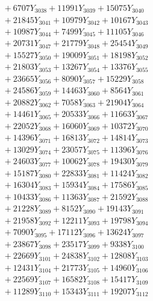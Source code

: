 \documentclass[a4paper,10pt]{article}
\begin{document}
{\begin{align}
&\;  + 6707 Y_{3038} + 11991 Y_{3039} + 15075 Y_{3040} \\[0.3ex]
&\;  + 21845 Y_{3041} + 10979 Y_{3042} + 10167 Y_{3043} \\[0.3ex]
&\;  + 10987 Y_{3044} + 7499 Y_{3045} + 11105 Y_{3046} \\[0.3ex]
&\;  + 20731 Y_{3047} + 21779 Y_{3048} + 25454 Y_{3049} \\[0.3ex]
&\;  + 15527 Y_{3050} + 19009 Y_{3051} + 18198 Y_{3052} \\[0.3ex]
&\;  + 21803 Y_{3053} + 13267 Y_{3054} + 13376 Y_{3055} \\[0.3ex]
&\;  + 23665 Y_{3056} + 8090 Y_{3057} + 15229 Y_{3058} \\[0.5ex]\allowbreak
&\;  + 24586 Y_{3059} + 14463 Y_{3060} + 8564 Y_{3061} \\[0.3ex]
&\;  + 20882 Y_{3062} + 7058 Y_{3063} + 21904 Y_{3064} \\[0.3ex]
&\;  + 14461 Y_{3065} + 20533 Y_{3066} + 11663 Y_{3067} \\[0.3ex]
&\;  + 22052 Y_{3068} + 16060 Y_{3069} + 10372 Y_{3070} \\[0.3ex]
&\;  + 14396 Y_{3071} + 16813 Y_{3072} + 14814 Y_{3073} \\[0.3ex]
&\;  + 13029 Y_{3074} + 23057 Y_{3075} + 11396 Y_{3076} \\[0.3ex]
&\;  + 24603 Y_{3077} + 10062 Y_{3078} + 19430 Y_{3079} \\[0.3ex]
&\;  + 15187 Y_{3080} + 22833 Y_{3081} + 11424 Y_{3082} \\[0.3ex]
&\;  + 16304 Y_{3083} + 15934 Y_{3084} + 17586 Y_{3085} \\[0.3ex]
&\;  + 10433 Y_{3086} + 11363 Y_{3087} + 21592 Y_{3088} \\[0.5ex]\allowbreak
&\;  + 21228 Y_{3089} + 8152 Y_{3090} + 19143 Y_{3091} \\[0.3ex]
&\;  + 21958 Y_{3092} + 12211 Y_{3093} + 19798 Y_{3094} \\[0.3ex]
&\;  + 7090 Y_{3095} + 17112 Y_{3096} + 13624 Y_{3097} \\[0.3ex]
&\;  + 23867 Y_{3098} + 23517 Y_{3099} + 9338 Y_{3100} \\[0.3ex]
&\;  + 22669 Y_{3101} + 24838 Y_{3102} + 12808 Y_{3103} \\[0.3ex]
&\;  + 12431 Y_{3104} + 21773 Y_{3105} + 14960 Y_{3106} \\[0.3ex]
&\;  + 22569 Y_{3107} + 16582 Y_{3108} + 15417 Y_{3109} \\[0.3ex]
&\;  + 11289 Y_{3110} + 15343 Y_{3111} + 19207 Y_{3112} \\[0.3ex]

\end{align}}
\end{document}
